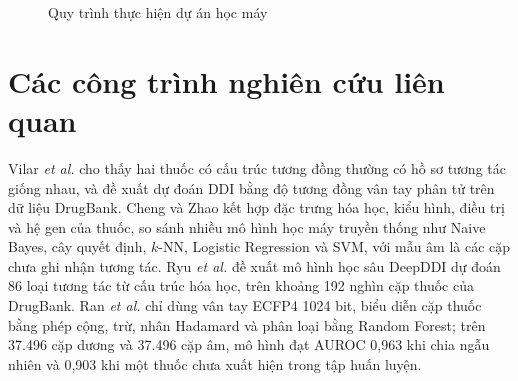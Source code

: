 \documentclass[12pt,a4paper,oneside]{report}
\begin{document}
\begin{figure}[H]
  \centering
  \caption{Quy trình thực hiện dự án học máy}
  \label{fig:quytrinh}
\end{figure}

\section{Các công trình nghiên cứu liên quan}
Vilar \textit{et al.} \cite{vilar2012} cho thấy hai thuốc có cấu trúc tương
đồng thường có hồ sơ tương tác giống nhau, và đề xuất dự đoán DDI bằng độ tương
đồng vân tay phân tử trên dữ liệu DrugBank. Cheng và Zhao \cite{cheng2014} kết
hợp đặc trưng hóa học, kiểu hình, điều trị và hệ gen của thuốc, so sánh nhiều
mô hình học máy truyền thống như Naive Bayes, cây quyết định, $k$-NN, Logistic
Regression và SVM, với mẫu âm là các cặp chưa ghi nhận tương tác. Ryu
\textit{et al.} \cite{ryu2018} đề xuất mô hình học sâu DeepDDI dự đoán 86 loại
tương tác từ cấu trúc hóa học, trên khoảng 192 nghìn cặp thuốc của DrugBank.
Ran \textit{et al.} \cite{ran2022} chỉ dùng vân tay ECFP4 1024 bit, biểu diễn
cặp thuốc bằng phép cộng, trừ, nhân Hadamard và phân loại bằng Random Forest;
trên 37.496 cặp dương và 37.496 cặp âm, mô hình đạt AUROC 0,963 khi chia ngẫu
nhiên và 0,903 khi một thuốc chưa xuất hiện trong tập huấn luyện.
\end{document}

